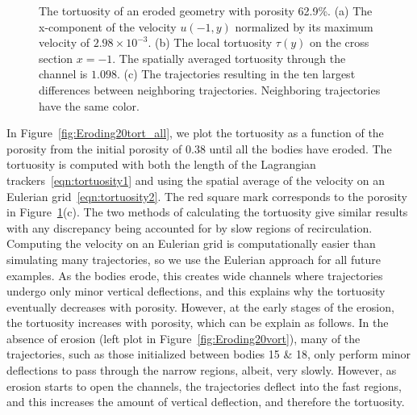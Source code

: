 \documentclass[preprint, 10pt]{elsarticle}
\begin{document}
\begin{figure}[H]
\begin{subfigure}[b]{0.5\textwidth}
\caption{}
\end{subfigure}
\caption{\label{fig:Eroding20tort} The tortuosity of an eroded geometry
with porosity 62.9\%. (a) The x-component of the velocity $u(-1, y)$
normalized by its maximum velocity of $2.98 \times 10^{-3}$. (b) The
local tortuosity $\tau(y)$ on the cross section $x = -1$.  The spatially
averaged tortuosity through the channel is $1.098$.  (c) The
trajectories resulting in the ten largest differences between
neighboring trajectories.  Neighboring trajectories have the same
color.}
\end{figure}

In Figure~\ref{fig:Eroding20tort_all}, we plot the tortuosity as a
function of the porosity from the initial porosity of $0.38$ until all
the bodies have eroded.  The tortuosity is computed with both the
length of the Lagrangian trackers~\eqref{eqn:tortuosity1} and using the
spatial average of the velocity on an Eulerian
grid~\eqref{eqn:tortuosity2}.  The red square mark corresponds to the
porosity in Figure~\ref{fig:Eroding20tort}(c).  The two methods of
calculating the tortuosity give similar results with any discrepancy
being accounted for by slow regions of recirculation.  Computing the
velocity on an Eulerian grid is computationally easier than simulating
many trajectories, so we use the Eulerian approach for all future
examples.  As the bodies erode, this creates wide channels where
trajectories undergo only minor vertical deflections, and this explains
why the tortuosity eventually decreases with porosity.  However, at the
early stages of the erosion, the tortuosity increases with porosity,
which can be explain as follows.   In the absence of erosion
(left plot in Figure~\ref{fig:Eroding20vort}), many of the trajectories,
such as those initialized between bodies 15 \& 18, only perform minor
deflections to pass through the narrow regions, albeit, very slowly.
However, as erosion starts to open the channels, the trajectories
deflect into the fast regions, and this increases the amount of vertical
deflection, and therefore the tortuosity.
\end{document}
